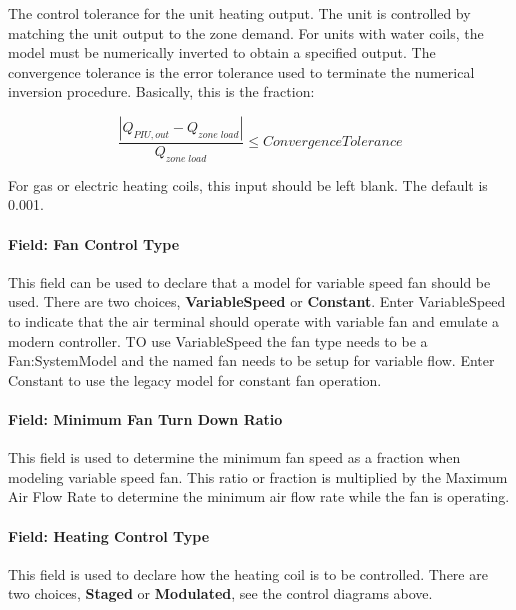 The control tolerance for the unit heating output. The unit is controlled by matching the unit output to the zone demand. For units with water coils, the model must be numerically inverted to obtain a specified output. The convergence tolerance is the error tolerance used to terminate the numerical inversion procedure. Basically, this is the fraction:

\begin{equation}
\frac{{\left| {{Q_{PIU,out}} - {Q_{zone\;load}}} \right|}}{{{Q_{zone\;load}}}} \le ConvergenceTolerance
\end{equation}

For gas or electric heating coils, this input should be left blank. The default is 0.001.

\paragraph{Field: Fan Control Type}\label{field-fan-control-type-seriesPIU}

This field can be used to declare that a model for variable speed fan should be used.  There are two choices, \textbf{VariableSpeed} or \textbf{Constant}.  Enter VariableSpeed to indicate that the air terminal should operate with variable fan and emulate a modern controller.  TO use VariableSpeed the fan type needs to be a Fan:SystemModel and the named fan needs to be setup for variable flow.  Enter Constant to use the legacy model for constant fan operation. 

\paragraph{Field: Minimum Fan Turn Down Ratio}\label{field-fan-turn-down-ratio-seriesPIU}

This field is used to determine the minimum fan speed as a fraction when modeling variable speed fan.  This ratio or fraction is multiplied by the Maximum Air Flow Rate to determine the minimum air flow rate while the fan is operating. 

\paragraph{Field: Heating Control Type}\label{field-heat-control-type-seriesPIU}

This field is used to declare how the heating coil is to be controlled.  There are two choices, \textbf{Staged} or \textbf{Modulated}, see the control diagrams above. 

